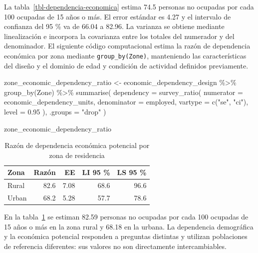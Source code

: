 \documentclass[
  spanish,
  11pt,
  letterpaper,
  oneside,
  open=any]{scrbook}
\newenvironment{Shaded}{\begin{snugshade}}{\end{snugshade}}
\newcommand{\AttributeTok}[1]{\textcolor[rgb]{0.40,0.45,0.13}{#1}}
\newcommand{\FloatTok}[1]{\textcolor[rgb]{0.68,0.00,0.00}{#1}}
\newcommand{\FunctionTok}[1]{\textcolor[rgb]{0.28,0.35,0.67}{#1}}
\newcommand{\NormalTok}[1]{\textcolor[rgb]{0.00,0.23,0.31}{#1}}
\newcommand{\OtherTok}[1]{\textcolor[rgb]{0.00,0.23,0.31}{#1}}
\newcommand{\SpecialCharTok}[1]{\textcolor[rgb]{0.37,0.37,0.37}{#1}}
\newcommand{\StringTok}[1]{\textcolor[rgb]{0.13,0.47,0.30}{#1}}
\begin{document}
La tabla~\ref{tbl-dependencia-economica} estima 74.5 personas no
ocupadas por cada 100 ocupadas de 15 años o más. El error estándar es
4.27 y el intervalo de confianza del 95 \% va de 66.04 a 82.96. La
varianza se obtiene mediante linealización e incorpora la covarianza
entre los totales del numerador y del denominador. El siguiente código
computacional estima la razón de dependencia económica por zona mediante
\texttt{group\_by(Zone)}, manteniendo las características del diseño y
el dominio de edad y condición de actividad definidos previamente.

\begin{Shaded}
\begin{Highlighting}[]
\NormalTok{zone\_economic\_dependency\_ratio }\OtherTok{\textless{}{-}}\NormalTok{ economic\_dependency\_design }\SpecialCharTok{\%\textgreater{}\%}
  \FunctionTok{group\_by}\NormalTok{(Zone) }\SpecialCharTok{\%\textgreater{}\%}
  \FunctionTok{summarise}\NormalTok{(}
    \AttributeTok{dependency =} \FunctionTok{survey\_ratio}\NormalTok{(}
      \AttributeTok{numerator =}\NormalTok{ economic\_dependency\_units,}
      \AttributeTok{denominator =}\NormalTok{ employed,}
      \AttributeTok{vartype =} \FunctionTok{c}\NormalTok{(}\StringTok{"se"}\NormalTok{, }\StringTok{"ci"}\NormalTok{),}
      \AttributeTok{level =} \FloatTok{0.95}
\NormalTok{    ),}
    \AttributeTok{.groups =} \StringTok{"drop"}
\NormalTok{  )}

\NormalTok{zone\_economic\_dependency\_ratio}
\end{Highlighting}
\end{Shaded}

{

\begin{longtable}[]{@{}lrrrr@{}}

\caption{\label{tbl-dependencia-economica-zona}Razón de dependencia
económica potencial por zona de residencia}

\tabularnewline

\toprule\noalign{}
Zona & Razón & EE & LI 95 \% & LS 95 \% \\
\midrule\noalign{}
\endhead
\bottomrule\noalign{}
\endlastfoot
Rural & 82.6 & 7.08 & 68.6 & 96.6 \\
Urban & 68.2 & 5.28 & 57.7 & 78.6 \\

\end{longtable}

}

En la tabla~\ref{tbl-dependencia-economica-zona} se estiman 82.59
personas no ocupadas por cada 100 ocupadas de 15 años o más en la zona
rural y 68.18 en la urbana. La dependencia demográfica y la económica
potencial responden a preguntas distintas y utilizan poblaciones de
referencia diferentes: sus valores no son directamente intercambiables.
\end{document}
